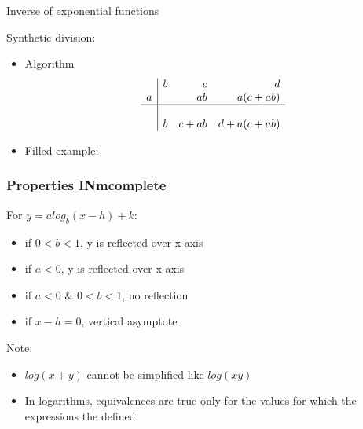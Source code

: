 \documentclass[openany]{book}
\begin{document}
Inverse of exponential functions

Synthetic division:\\

\begin{itemize}

	\item Algorithm\\
	      
	      \[
		      \begin{array}{c|rrr}
			      
			        & b & c    & d         \\
			      a &   & ab   & a(c+ab)   \\
			      \hline                   \\
			        & b & c+ab & d+a(c+ab) \\
			      
		      \end{array}
	      \]
	      
	\item Filled example:\\
	      
	      
\end{itemize}
\subsubsection{Properties INmcomplete}

For \(y=alog_b(x-h)+k\):

\begin{itemize}
	\item if \(0<b<1\), y is reflected over x-axis
	\item if \(a<0\), y is reflected over x-axis
	\item if \(a<0\) \& \(0<b<1\), no reflection
	\item if \(x-h=0\), vertical asymptote
\end{itemize}

Note:

\begin{itemize}
	\item \(log(x+y)\) cannot be simplified like \(log(xy)\)
	\item In logarithms, equivalences are true only for the values for which the expressions the defined.
\end{itemize}
\end{document}
